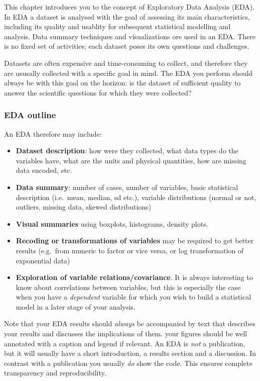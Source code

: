 \documentclass[]{book}
\providecommand{\tightlist}{%
  \setlength{\itemsep}{0pt}\setlength{\parskip}{0pt}}
\begin{document}
This chapter introduces you to the concept of Exploratory Data Analysis (EDA). In EDA a dataset is analysed with the goal of assessing its main characteristics, including its quality and usablity for subsequent statistical modelling and analysis. Data summary techniques and visualizations ore used in an EDA. There is no fixed set of activities; each dataset poses its own questions and challenges.

Datasets are often expensive and time-consuming to collect, and therefore they are ususally collected with a specific goal in mind. The EDA you perform should always be with this goal on the horizon: is the dataset of sufficient quality to answer the scientific questions for which they were collected?

\hypertarget{eda-outline}{%
\subsubsection*{EDA outline}\label{eda-outline}}

An EDA therefore may include:

\begin{itemize}
\tightlist
\item
  \textbf{Dataset description}: how were they collected, what data types do the variables have, what are the units and physical quantities, how are missing data encoded, etc.
\item
  \textbf{Data summary}: number of cases, number of variables, basic statistical description (i.e.~mean, median, sd etc.), variable distributions (normal or not, outliers, missing data, skewed distributions)
\item
  \textbf{Visual summaries} using boxplots, histograms, density plots.
\item
  \textbf{Recoding or transformations of variables} may be required to get better results (e.g.~from numeric to factor or vice versa, or log transformation of exponential data)
\item
  \textbf{Exploration of variable relations/covariance}. It is always interesting to know about correlations between variables, but this is especially the case when you have a \emph{dependent} variable for which you wish to build a statistical model in a later stage of your analysis.
\end{itemize}

Note that your EDA results should \emph{always} be accompanied by text that describes your results and discusses the implications of them. your figures should be well annotated with a caption and legend if relevant. An EDA is \emph{not} a publication, but it will usually have a short introduction, a results section and a discussion. In contrast with a publication you usually \emph{do} show the code. This ensures complete transparency and reproducibility.
\end{document}
